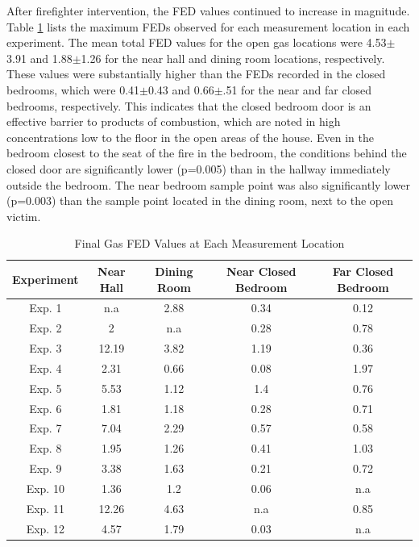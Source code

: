 \documentclass[12pt,oneside]{article}
\begin{document}
After firefighter intervention, the FED values continued to increase in magnitude. Table \ref{tab:final_fed} lists the maximum FEDs observed for each measurement location in each experiment. The mean total FED values for the open gas locations were 4.53$\pm$3.91 and 1.88$\pm$1.26 for the near hall and dining room locations, respectively. These values were substantially higher than the FEDs recorded in the closed bedrooms, which were 0.41$\pm$0.43 and 0.66$\pm$.51 for the near and far closed bedrooms, respectively. This indicates that the closed bedroom door is an effective barrier to products of combustion, which are noted in high concentrations low to the floor in the open areas of the house. Even in the bedroom closest to the seat of the fire in the bedroom, the conditions behind the closed door are significantly lower (p=0.005) than in the hallway immediately outside the bedroom. The near bedroom sample point was also significantly lower (p=0.003) than the sample point located in the dining room, next to the open victim.

\begin{table}[!ht]
    \centering
    \caption{Final Gas FED Values at Each Measurement Location}
    \label{tab:final_fed}
    \begin{tabular}{ccccc}
    \toprule[1.5pt]
	\textbf{Experiment}  &   \textbf{Near Hall}& \textbf{Dining Room}& \textbf{Near Closed Bedroom}& \textbf{Far Closed Bedroom} \\ 
	  \midrule                                                                   
	Exp. 1 &       n.a&     2.88&         0.34&        0.12 \\  
	Exp. 2 &         2&      n.a&         0.28&        0.78 \\
	Exp. 3 &     12.19&     3.82&         1.19&        0.36 \\               
	Exp. 4 &      2.31&     0.66&         0.08&        1.97 \\                
	Exp. 5 &      5.53&     1.12&          1.4&        0.76 \\                 
	Exp. 6 &      1.81&     1.18&         0.28&        0.71 \\                 
	Exp. 7 &      7.04&     2.29&         0.57&        0.58 \\                
	Exp. 8 &      1.95&     1.26&         0.41&        1.03 \\            
	Exp. 9 &      3.38&     1.63&         0.21&        0.72 \\              
	Exp. 10&      1.36&      1.2&         0.06&         n.a \\         
	Exp. 11&     12.26&     4.63&          n.a&        0.85 \\             
	Exp. 12&      4.57&     1.79&         0.03&         n.a \\           
	 \bottomrule[1.25pt] 

    \end{tabular}
\end{table}
\end{document}
